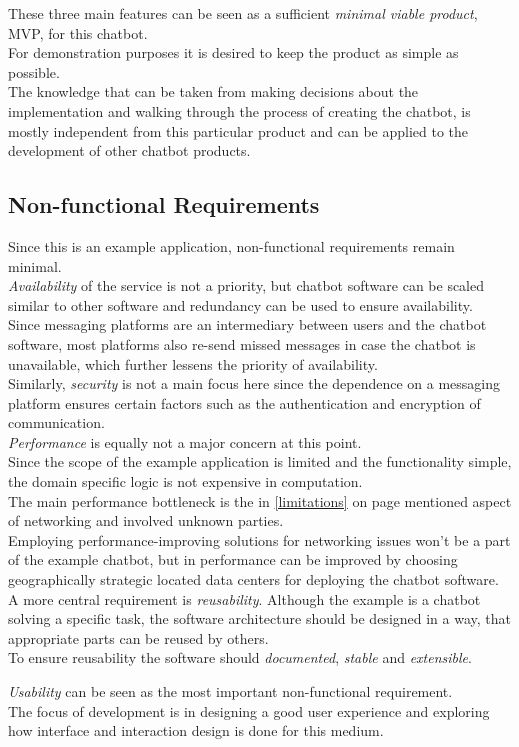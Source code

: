 These three main features can be seen as a sufficient \emph{minimal viable product}, MVP, for this chatbot.
\\

For demonstration purposes it is desired to keep the product as simple as possible.
\\
The knowledge that can be taken from making decisions about the implementation and walking through the process of creating the chatbot,
is mostly independent from this particular product and can be applied to the development of other chatbot products.


\subsection{Non-functional Requirements}

Since this is an example application, non-functional requirements remain minimal.
\\

\emph{Availability} of the service is not a priority, but chatbot software can be scaled similar to other software and redundancy can be used to ensure availability.
\\
Since messaging platforms are an intermediary between users and the chatbot software, most platforms also re-send missed messages in case the chatbot is unavailable, which further lessens the priority of availability.
\\

Similarly, \emph{security} is not a main focus here since the dependence on a messaging platform ensures certain factors such as the authentication and encryption of communication.
\\

\emph{Performance} is equally not a major concern at this point.
\\
Since the scope of the example application is limited and the functionality simple,
the domain specific logic is not expensive in computation.
\\
The main performance bottleneck is the in \ref{limitations} on page \pageref{limitations} mentioned aspect of networking and involved unknown parties.
\\
Employing performance-improving solutions for networking issues won't be a part of the example chatbot,
but in performance can be improved by choosing geographically strategic located data centers for deploying the chatbot software.
\\

A more central requirement is \emph{reusability}.
Although the example is a chatbot solving a specific task,
the software architecture should be designed in a way,
that appropriate parts can be reused by others.
\\
To ensure reusability the software should \emph{documented}, \emph{stable} and \emph{extensible}.

\emph{Usability} can be seen as the most important non-functional requirement.
\\
The focus of development is in designing a good user experience and exploring how interface and interaction design is done for this medium.
